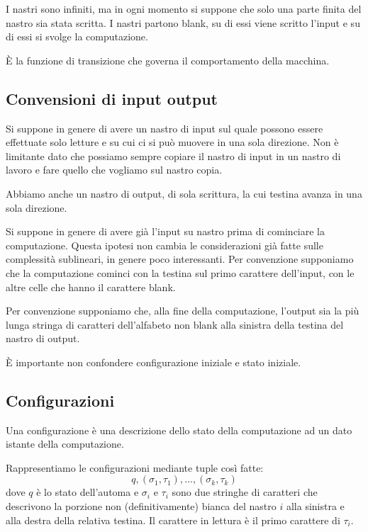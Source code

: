 I nastri sono infiniti, ma in ogni momento si suppone che solo una parte finita del nastro sia stata
scritta. I nastri partono blank, su di essi viene scritto l'input e su di essi si svolge la
computazione.

È la funzione di transizione che governa il comportamento della macchina.

\subsection{Convensioni di input output}


Si suppone in genere di avere un nastro di input sul quale possono essere effettuate solo letture e
su cui ci si può muovere in una sola direzione. Non è limitante dato che possiamo sempre copiare il
nastro di input in un nastro di lavoro e fare quello che vogliamo sul nastro copia.

Abbiamo anche un nastro di output, di sola scrittura, la cui testina avanza in una sola direzione.

Si suppone in genere di avere già l'input su nastro prima di cominciare la computazione.  Questa
ipotesi non cambia le considerazioni già fatte sulle complessità sublineari, in genere poco
interessanti. Per convenzione supponiamo che la computazione cominci con la testina sul primo
carattere dell'input, con le altre celle che hanno il carattere blank.

Per convenzione supponiamo che, alla fine della computazione, l'output sia la più lunga stringa di
caratteri dell'alfabeto non blank alla sinistra della testina del nastro di output.

È importante non confondere configurazione iniziale e stato iniziale.

\subsection{Configurazioni}

Una configurazione è una descrizione dello stato della computazione ad un dato istante della
computazione.

Rappresentiamo le configurazioni mediante tuple così fatte:
\begin{equation*}
    q, (\sigma_{1},\tau_{1}),\dotsc,(\sigma_{k},\tau_{k})
\end{equation*}
dove $q$ è lo stato dell'automa e $\sigma_{i}$ e $\tau_{i}$ sono due stringhe di caratteri che
descrivono la porzione non (definitivamente) bianca del nastro $i$ alla sinistra e alla destra della
relativa testina. Il carattere in lettura è il primo carattere di $\tau_{i}$.

